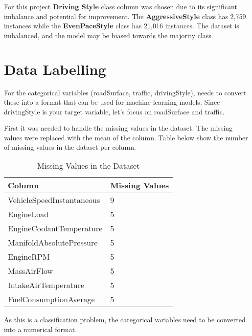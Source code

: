 For this project \textbf{Driving Style} class column was chosen due to its significant imbalance and potential for improvement. 
The \textbf{AggressiveStyle} class has 2,759 instances while the \textbf{EvenPaceStyle} class has 21,016 instances. The dataset is imbalanced, 
and the model may be biased towards the majority class. 

\section{Data Labelling}
For the categorical variables (roadSurface, traffic, drivingStyle), needs to convert these into a format that can be used for machine learning models. 
Since drivingStyle is your target variable, let's focus on roadSurface and traffic. 

First it was needed to handle the missing values in the dataset. The missing values were replaced with the mean of the column.
Table below show the number of missing values in the dataset per column.

\begin{table}[ht]
    \centering
    \caption{Missing Values in the Dataset}
    \begin{tabular}{|l|l|}
    \hline
    \textbf{Column}                   & \textbf{Missing Values} \\ \hline
    VehicleSpeedInstantaneous         & 9                       \\ \hline
    EngineLoad                        & 5                       \\ \hline
    EngineCoolantTemperature          & 5                       \\ \hline
    ManifoldAbsolutePressure          & 5                       \\ \hline
    EngineRPM                         & 5                       \\ \hline
    MassAirFlow                       & 5                       \\ \hline
    IntakeAirTemperature              & 5                       \\ \hline
    FuelConsumptionAverage            & 5                       \\ \hline
\end{tabular}
\end{table}
    



As this is a classification problem, the categorical variables need to be converted into a numerical format.




